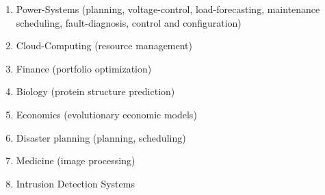 \begin{enumerate}
  \item Power-Systems (planning, voltage-control, load-forecasting, maintenance scheduling, fault-diagnosis, control and configuration) \cite{bansal2006bibliographical}
  \item Cloud-Computing (resource management) \cite{guzek2015survey}
  \item Finance (portfolio optimization) \cite{ponsich2013survey, aguilar2015genetic}
  \item Biology (protein structure prediction) \cite{Krasnogor:1999:PSP:2934046.2934162, xiu2003evolutionary}
  \item Economics (evolutionary economic models) \cite{safarzynska2010evolutionary}
  \item Disaster planning (planning, scheduling) \cite{zheng2015evolutionary}
  \item Medicine (image processing) \cite{damas2011medical}
  \item Intrusion Detection Systems \cite{wu2010use}
\end{enumerate}
